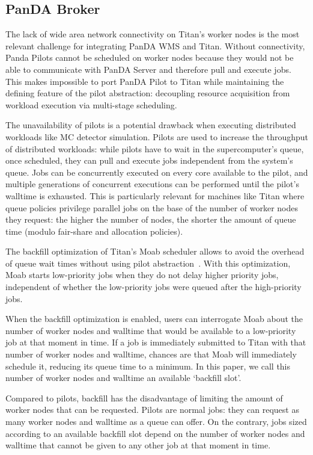 \documentclass[conference]{IEEEtran}
\begin{document}
\subsection{PanDA Broker}
\label{ssec:panda_titan}

The lack of wide area network connectivity on Titan's worker nodes is the most
relevant challenge for integrating PanDA WMS and Titan. Without connectivity,
Panda Pilots cannot be scheduled on worker nodes because they would not be able
to communicate with PanDA Server and therefore pull and execute jobs. This makes
impossible to port PanDA Pilot to Titan while maintaining the defining feature
of the pilot abstraction: decoupling resource acquisition from workload
execution via multi-stage scheduling.

The unavailability of pilots is a potential drawback when executing distributed
workloads like MC detector simulation. Pilots are used to increase the
throughput of distributed workloads: while pilots have to wait in the
supercomputer's queue, once scheduled, they can pull and execute jobs
independent from the system's queue. Jobs can be concurrently executed on
every core available to the pilot, and multiple generations of concurrent
executions can be performed until the pilot's walltime is exhausted. This is
particularly relevant for machines like Titan where queue policies privilege
parallel jobs on the base of the number of worker nodes they request: the higher
the number of nodes, the shorter the amount of queue time (modulo fair-share and
allocation policies).

The backfill optimization of Titan's Moab scheduler allows to avoid the overhead
of queue wait times without using pilot abstraction~\cite{maui_backfill_url}.
With this optimization, Moab starts low-priority jobs when they do not delay
higher priority jobs, independent of whether the low-priority jobs were queued
after the high-priority jobs.

When the backfill optimization is enabled, users can interrogate Moab about the
number of worker nodes and walltime that would be available to a low-priority
job at that moment in time. If a job is immediately submitted to Titan with that
number of worker nodes and walltime, chances are that Moab will immediately
schedule it, reducing its queue time to a minimum. In this paper, we call this
number of worker nodes and walltime an available `backfill slot'.

Compared to pilots, backfill has the disadvantage of limiting the amount of
worker nodes that can be requested. Pilots are normal jobs: they can request as
many worker nodes and walltime as a queue can offer. On the contrary, jobs sized
according to an available backfill slot depend on the number of worker nodes and
walltime that cannot be given to any other job at that moment in time.
\end{document}
